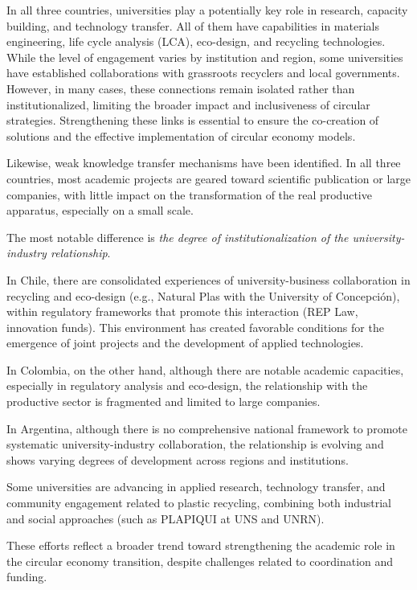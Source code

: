 \documentclass[
  12pt,
  oneside]{book}
\begin{document}
In all three countries, universities play a potentially key role in
research, capacity building, and technology transfer. All of them have
capabilities in materials engineering, life cycle analysis (LCA),
eco-design, and recycling technologies. While the level of engagement
varies by institution and region, some universities have established
collaborations with grassroots recyclers and local governments. However,
in many cases, these connections remain isolated rather than
institutionalized, limiting the broader impact and inclusiveness of
circular strategies. Strengthening these links is essential to ensure
the co-creation of solutions and the effective implementation of
circular economy models.

Likewise, weak knowledge transfer mechanisms have been identified. In
all three countries, most academic projects are geared toward scientific
publication or large companies, with little impact on the transformation
of the real productive apparatus, especially on a small scale.

The most notable difference is \emph{the degree of institutionalization
of the university-industry relationship}.

In Chile, there are consolidated experiences of university-business
collaboration in recycling and eco-design (e.g., Natural Plas with the
University of Concepción), within regulatory frameworks that promote
this interaction (REP Law, innovation funds). This environment has
created favorable conditions for the emergence of joint projects and the
development of applied technologies.

In Colombia, on the other hand, although there are notable academic
capacities, especially in regulatory analysis and eco-design, the
relationship with the productive sector is fragmented and limited to
large companies.

In Argentina, although there is no comprehensive national framework to
promote systematic university-industry collaboration, the relationship
is evolving and shows varying degrees of development across regions and
institutions.

Some universities are advancing in applied research, technology
transfer, and community engagement related to plastic recycling,
combining both industrial and social approaches (such as PLAPIQUI at UNS
and UNRN).

These efforts reflect a broader trend toward strengthening the academic
role in the circular economy transition, despite challenges related to
coordination and funding.
\end{document}
